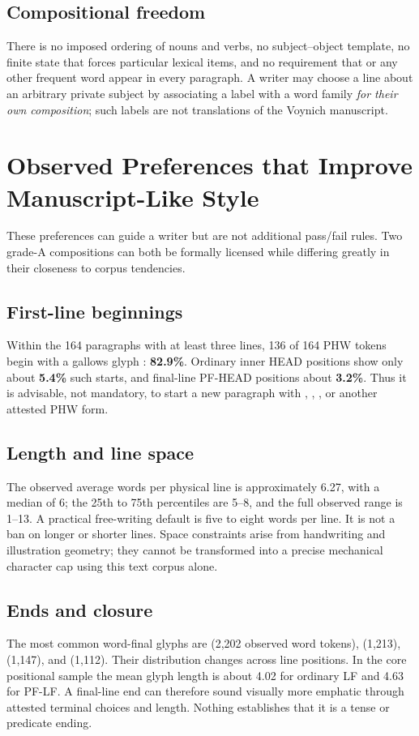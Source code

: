 \documentclass[11pt,a4paper]{article}
\newcommand{\EVA}[1]{{\ttfamily\detokenize{#1}}}
\begin{document}
\subsection{Compositional freedom}
There is no imposed ordering of nouns and verbs, no subject--object template, no finite state that forces particular lexical items, and no requirement that \EVA{daiin} or any other frequent word appear in every paragraph. A writer may choose a line about an arbitrary private subject by associating a label with a word family \emph{for their own composition}; such labels are not translations of the Voynich manuscript.

\section{Observed Preferences that Improve Manuscript-Like Style}
These preferences can guide a writer but are not additional pass/fail rules. Two grade-A compositions can both be formally licensed while differing greatly in their closeness to corpus tendencies.

\subsection{First-line beginnings}
Within the 164 paragraphs with at least three lines, 136 of 164 PHW tokens begin with a gallows glyph \EVA{p/f/k/t}: \textbf{82.9\%}. Ordinary inner HEAD positions show only about \textbf{5.4\%} such starts, and final-line PF-HEAD positions about \textbf{3.2\%}. Thus it is advisable, not mandatory, to start a new paragraph with \EVA{pchor}, \EVA{tchor}, \EVA{tshol}, or another attested PHW form.

\subsection{Length and line space}
The observed average words per physical line is approximately 6.27, with a median of 6; the 25th to 75th percentiles are 5--8, and the full observed range is 1--13. A practical free-writing default is five to eight words per line. It is not a ban on longer or shorter lines. Space constraints arise from handwriting and illustration geometry; they cannot be transformed into a precise mechanical character cap using this text corpus alone.

\subsection{Ends and closure}
The most common word-final glyphs are \EVA{y} (2,202 observed word tokens), \EVA{n} (1,213), \EVA{l} (1,147), and \EVA{r} (1,112). Their distribution changes across line positions. In the core positional sample the mean glyph length is about 4.02 for ordinary LF and 4.63 for PF-LF. A final-line end can therefore sound visually more emphatic through attested terminal choices and length. Nothing establishes that it is a tense or predicate ending.
\end{document}

